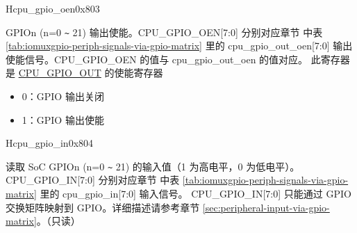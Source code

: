 \begin{register}{H}{cpu\_gpio\_oen}{0x803}\label{regdesc:GPIO_OEN}
%
%
%
%
%
%
%
%
%
\regnewline%
\begin{regdesc}\begin{reglist}
\label{fielddesc:GPIO_OEN}\item [CPU\_GPIO\_OEN] GPIOn (n=0 \verb+~+ 21) 输出使能。CPU\_GPIO\_OEN[7:0] 分别对应章节 \textit{} 中表 \ref{tab:iomuxgpio-periph-signals-via-gpio-matrix} 里的 cpu\_gpio\_out\_oen[7:0] 输出使能信号。CPU\_GPIO\_OEN 的值与 cpu\_gpio\_out\_oen 的值对应。
\newline 此寄存器是 \hyperref[fielddesc:GPIO_OUT]{CPU\_GPIO\_OUT} 的使能寄存器
\begin{itemize}
    \setlength\itemsep{-1em}
    \item 0：GPIO 输出关闭
    \item 1：GPIO 输出使能
\end{itemize}
\end{reglist}\end{regdesc}
\end{register}

\begin{register}{H}{cpu\_gpio\_in}{0x804}\label{regdesc:GPIO_IN}
%
%
%
%
%
%
%
%
%
\regnewline%
\begin{regdesc}\begin{reglist}
\label{fielddesc:GPIO_IN}\item [CPU\_GPIO\_IN] 读取 SoC GPIOn (n=0 \verb+~+ 21) 的输入值（1 为高电平，0 为低电平）。
\newline CPU\_GPIO\_IN[7:0] 分别对应章节 \textit{} 中表 \ref{tab:iomuxgpio-periph-signals-via-gpio-matrix} 里的 cpu\_gpio\_in[7:0] 输入信号。
\newline CPU\_GPIO\_IN[7:0] 只能通过 GPIO 交换矩阵映射到 GPIO。详细描述请参考章节 \ref{sec:peripheral-input-via-gpio-matrix}。（只读）
\end{reglist}\end{regdesc}
\end{register}


